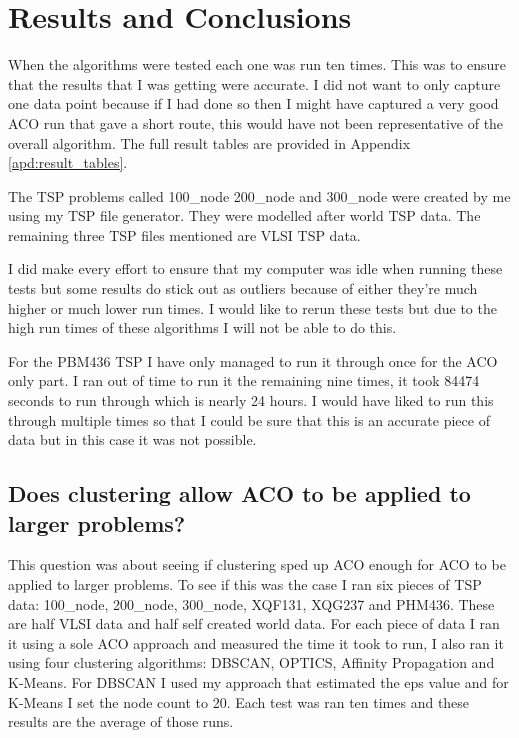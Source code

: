 \chapter{Results and Conclusions}

When the algorithms were tested each one was run ten times. This was to ensure that the results that I was getting were accurate. I did not want to only capture one data point because if I had done so then I might have captured a very good ACO run that gave a short route, this would have not been representative of the overall algorithm. The full result tables are provided in Appendix \ref{apd:result_tables}.

The TSP problems called 100\_node 200\_node and 300\_node were created by me using my TSP file generator. They were modelled after world TSP data. The remaining three TSP files mentioned are VLSI TSP data.

I did make every effort to ensure that my computer was idle when running these tests but some results do stick out as outliers because of either they're much higher or much lower run times. I would like to rerun these tests but due to the high run times of these algorithms I will not be able to do this. 

For the PBM436 TSP I have only managed to run it through once for the ACO only part. I ran out of time to run it the remaining nine times, it took 84474 seconds to run through which is nearly 24 hours. I would have liked to run this through multiple times so that I could be sure that this is an accurate piece of data but in this case it was not possible.

\section{Does clustering allow ACO to be applied to larger problems?}

This question was about seeing if clustering sped up ACO enough for ACO to be applied to larger problems. To see if this was the case I ran six pieces of TSP data: 100\_node, 200\_node, 300\_node, XQF131, XQG237 and PHM436. These are half VLSI data and half self created world data. For each piece of data I ran it using a sole ACO approach and measured the time it took to run, I also ran it using four clustering algorithms: DBSCAN, OPTICS, Affinity Propagation and K-Means. For DBSCAN I used my approach that estimated the eps value and for K-Means I set the node count to 20. Each test was ran ten times and these results are the average of those runs.

